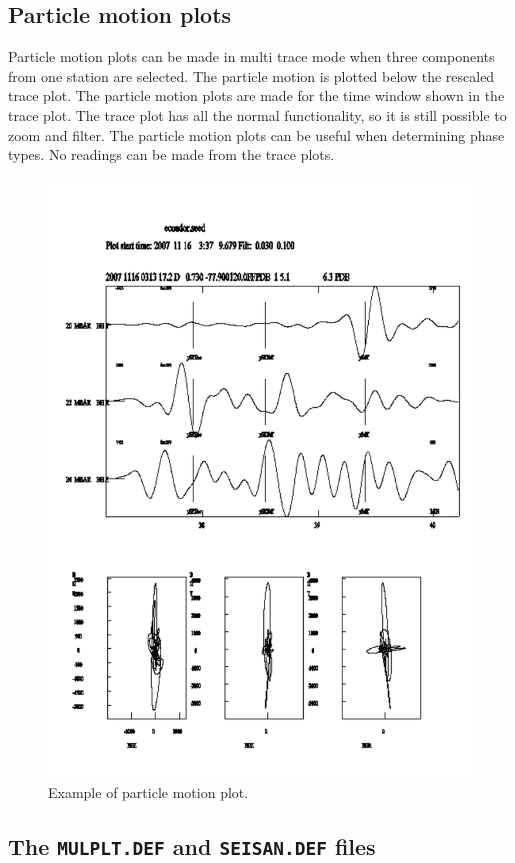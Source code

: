 \subsection{Particle motion plots}

Particle motion plots can be made in multi trace mode when three components from one station are selected. The particle motion is plotted below the rescaled trace plot. The particle motion plots are made for the time window shown in the trace plot. The trace plot has all the normal functionality, so it is still possible to zoom and filter. The particle motion plots can be useful when determining phase types. No readings can be made from the trace plots. 

\begin{figure}
\centerline{\includegraphics[width=0.9\linewidth]{fig/fig27}}
\caption{Example of particle motion plot.}
\end{figure}

\subsection{The \texttt{MULPLT.DEF} and \texttt{SEISAN.DEF} files}

